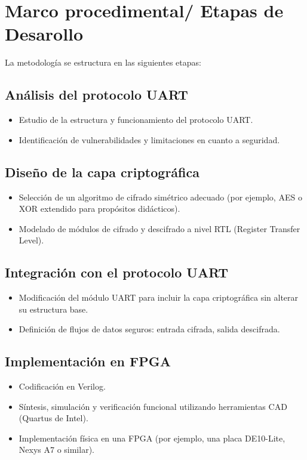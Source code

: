 \section{Marco procedimental/ Etapas de Desarollo}
La metodología se estructura en las siguientes etapas:



\subsection{Análisis del protocolo UART }

\begin{itemize}
\item Estudio de la estructura y funcionamiento del protocolo UART.
\item Identificación de vulnerabilidades y limitaciones en cuanto a seguridad.
\end{itemize}

\subsection{Diseño de la capa criptogr\'afica }

\begin{itemize}
\item Selección de un algoritmo de cifrado simétrico adecuado (por ejemplo, AES o XOR extendido para propósitos didácticos).
\item Modelado de módulos de cifrado y descifrado a nivel RTL (Register Transfer Level).
\end{itemize}

\subsection{Integración con el protocolo UART }

\begin{itemize}
\item Modificación del módulo UART para incluir la capa criptográfica sin alterar su estructura base.
\item Definición de flujos de datos seguros: entrada cifrada, salida descifrada.
\end{itemize}

\subsection{Implementación en FPGA}

\begin{itemize}
\item Codificación en Verilog.
\item Síntesis, simulación y verificación funcional utilizando herramientas CAD (Quartus de Intel).
\item Implementación física en una FPGA (por ejemplo, una placa DE10-Lite, Nexys A7 o similar).
\end{itemize}


